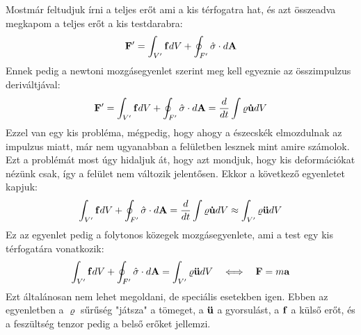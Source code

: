\documentclass[../main.tex]{subfiles}
\begin{document}
Mostmár feltudjuk írni a teljes erőt ami a kis térfogatra hat, és azt összeadva megkapom a teljes erőt a kis testdarabra:
\begin{equation}
    \bold{F}' = \int_{V'} \bold{f} dV + \oint_{F'} \hat{\sigma} \cdot d\bold{A}
\end{equation}
Ennek pedig a newtoni mozgásegyenlet szerint meg kell egyeznie az összimpulzus deriváltjával:
\begin{equation}
    \bold{F}' = \int_{V'} \bold{f} dV + \oint_{F'} \hat{\sigma} \cdot d\bold{A} = \frac{d}{dt} \int \varrho \bold{\dot{u}} dV
\end{equation}
Ezzel van egy kis probléma, mégpedig, hogy ahogy a észecskék elmozdulnak az impulzus miatt, már nem ugyanabban a felületben lesznek mint amire számolok.
Ezt a problémát most úgy hidaljuk át, hogy azt mondjuk, hogy kis deformációkat nézünk csak, így a felület nem változik jelentősen. Ekkor a következő egyenletet kapjuk:
\begin{equation}
     \int_{V'} \bold{f} dV + \oint_{F'} \hat{\sigma} \cdot d\bold{A} =\frac{d}{dt} \int \varrho \bold{\dot{u}} dV \approx \int_{V'} \varrho \bold{\ddot{u}} dV
\end{equation}
Ez az egyenlet pedig a folytonos közegek mozgásegyenlete, ami a test egy kis térfogatára vonatkozik:
\begin{equation}
    \int_{V'} \bold{f} dV + \oint_{F'} \hat{\sigma} \cdot d\bold{A} = \int_{V'} \varrho \bold{\ddot{u}} dV \quad \Longleftrightarrow \quad \bold{F} = m \bold{a}
\end{equation}
Ezt általánosan nem lehet megoldani, de speciális esetekben igen. Ebben az egyenletben a $\varrho$ sűrűség "játsza" a tömeget, a $\bold{\ddot{u}}$ a gyorsulást, 
a $\bold{f}$ a külső erőt, és a feszültség tenzor pedig a belső erőket jellemzi.
\end{document}
